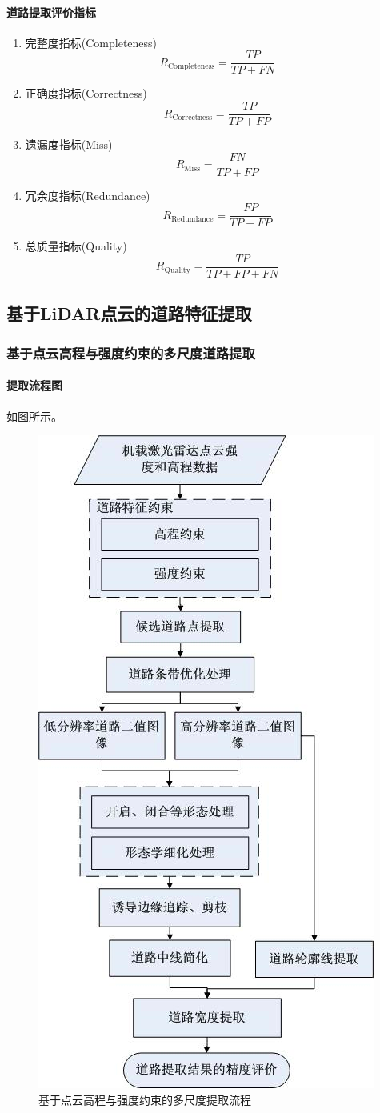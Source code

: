 \paragraph{道路提取评价指标}
\begin{enumerate}
	\item 完整度指标(Completeness)
		\begin{equation}
		R_{\text{Completeness}} = \dfrac{TP}{TP + FN}
		\end{equation}
	\item 正确度指标(Correctness)
		\begin{equation}
		R_{\text{Correctness}} = \dfrac{TP}{TP + FP}
		\end{equation}
	\item 遗漏度指标(Miss)
		\begin{equation}
		R_{\text{Miss}} = \dfrac{FN}{TP + FP}
		\end{equation}
	\item 冗余度指标(Redundance)
		\begin{equation}
		R_{\text{Redundance}} = \dfrac{FP}{TP + FP}
		\end{equation}
	\item 总质量指标(Quality)
		\begin{equation}
		R_{\text{Quality}} = \dfrac{TP}{TP + FP + FN}
		\end{equation}
\end{enumerate}

\subsection{基于LiDAR点云的道路特征提取}
\subsubsection{基于点云高程与强度约束的多尺度道路提取}
\paragraph{提取流程图}如图所示。
\begin{figure}[htbp]
	\centering
	\includegraphics[width=0.3\linewidth]{figure/Chapter6/基于点云高程与强度约束的多尺度提取流程}
	\caption{基于点云高程与强度约束的多尺度提取流程}
	\label{fig:基于点云高程与强度约束的多尺度提取流程}
\end{figure}

